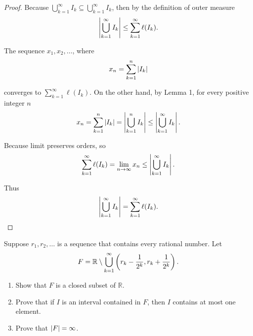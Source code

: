 \begin{proof}
    Because $\bigcup^{\infty}_{k=1}I_{k}\subseteq \bigcup^{\infty}_{k=1}I_{k}$, then by the definition of outer measure
    \[
        \left\vert{\bigcup^{\infty}_{k=1}I_{k}}\right\vert \leq \sum^{\infty}_{k=1}\ell(I_{k}).
    \]

    The sequence $x_{1}, x_{2}, \ldots$, where
    \[
        x_{n} = \sum^{n}_{k=1}\left\vert{I_{k}}\right\vert
    \]

    converges to $\sum^{\infty}_{k=1}\ell(I_{k})$. On the other hand, by Lemma 1, for every positive integer $n$
    \[
        x_{n} = \sum^{n}_{k=1}\left\vert{I_{k}}\right\vert = \left\vert{\bigcup^{n}_{k=1}I_{k}}\right\vert \leq \left\vert{\bigcup^{\infty}_{k=1}I_{k}}\right\vert.
    \]

    Because limit preserves orders, so
    \[
        \sum^{\infty}_{k=1}\ell(I_{k}) = \lim\limits_{n\to\infty}x_{n} \leq \left\vert{\bigcup^{\infty}_{k=1}I_{k}}\right\vert.
    \]

    Thus
    \[
        \left\vert{\bigcup^{\infty}_{k=1}I_{k}}\right\vert = \sum^{\infty}_{k=1}\ell(I_{k}).
    \]
\end{proof}
\newpage

\begin{exercise}\label{chapter2:sectionA:exercise12}
    Suppose $r_{1}, r_{2}, \ldots$ is a sequence that contains every rational number. Let
    \[
        F = \mathbb{R}\setminus \bigcup^{\infty}_{k=1}\left({r_{k} - \frac{1}{2^{k}}, r_{k} + \frac{1}{2^{k}}}\right).
    \]

    \begin{enumerate}[label={(\alph*)}]
        \item Show that $F$ is a closed subset of $\mathbb{R}$.
        \item Prove that if $I$ is an interval contained in $F$, then $I$ contains at most one element.
        \item Prove that $\left\vert{F}\right\vert = \infty$.
    \end{enumerate}
\end{exercise}

